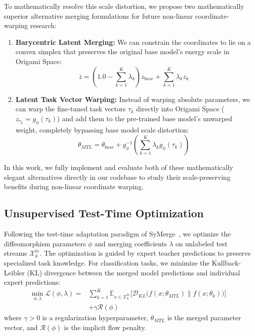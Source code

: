 To mathematically resolve this scale distortion, we propose two mathematically superior alternative merging formulations for future non-linear coordinate-warping research:
\begin{enumerate}
  \item \textbf{Barycentric Latent Merging:} We can constrain the coordinates to lie on a convex simplex that preserves the original base model's energy scale in Origami Space:
    \begin{equation}
      \bar{z} = \left(1.0 - \sum_{k=1}^K \lambda_k\right) z_{base} + \sum_{k=1}^K \lambda_k z_k
    \end{equation}
  \item \textbf{Latent Task Vector Warping:} Instead of warping absolute parameters, we can warp the fine-tuned task vectors $\tau_k$ directly into Origami Space ($z_{\tau_k} = g_\phi(\tau_k)$) and add them to the pre-trained base model's unwarped weight, completely bypassing base model scale distortion:
    \begin{equation}
      \theta_{MTL} = \theta_{base} + g_\phi^{-1}\left( \sum_{k=1}^K \lambda_k g_\phi(\tau_k) \right)
    \end{equation}
\end{enumerate}
In this work, we fully implement and evaluate both of these mathematically elegant alternatives directly in our codebase to study their scale-preserving benefits during non-linear coordinate warping.

\subsection{Unsupervised Test-Time Optimization}
Following the test-time adaptation paradigm of SyMerge~\cite{jung2025symerge}, we optimize the diffeomorphism parameters $\phi$ and merging coefficients $\lambda$ on unlabeled test streams $\mathcal{X}^{te}_k$. 
The optimization is guided by expert teacher predictions to preserve specialized task knowledge. 
For classification tasks, we minimize the Kullback-Leibler (KL) divergence between the merged model predictions and individual expert predictions:
\begin{equation}
  \label{eq:joint_loss}
  \begin{aligned}
    \min_{\phi, \lambda} \mathcal{L}(\phi, \lambda) = &\sum_{k=1}^K \mathbb{E}_{x \in \mathcal{X}^{te}_k} \Big[ \mathcal{D}_{KL}\Big( f(x; \theta_{MTL}) \parallel f(x; \theta_k) \Big) \Big] \\
    &+ \gamma \mathcal{R}(\phi)
  \end{aligned}
\end{equation}
where $\gamma > 0$ is a regularization hyperparameter, $\theta_{MTL}$ is the merged parameter vector, and $\mathcal{R}(\phi)$ is the implicit flow penalty.

